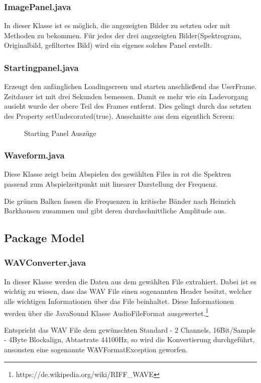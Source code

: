 \documentclass[12pt,a4paper]{article}
\begin{document}
\subsubsection{ImagePanel.java}
In dieser Klasse ist es möglich, die angezeigten Bilder zu setzten oder mit Methoden zu bekommen. Für jedes der drei angezeigten Bilder(Spektrogram, Originalbild, gefiltertes Bild) wird ein eigenes solches Panel erstellt.
\subsubsection{Startingpanel.java}
Erzeugt den anfänglichen Loadingscreen und starten anschließend das UserFrame. Zeitdauer ist mit drei Sekunden bemessen. Damit es mehr wie ein Ladevorgang ausieht wurde der obere Teil des Frames entfernt. Dies gelingt durch das setzten des Property setUndecorated(true).
Ausschnitte aus dem eigentlich Screen:
\begin{figure} [h]%
	\centering
	\label{fig:startingpanel} 
	\caption{Starting Panel Auszüge}
\end{figure}\newpage

\subsubsection{Waveform.java}
Diese Klasse zeigt beim Abspielen des gewählten Files in rot die Spektren passend zum Abspielzeitpunkt mit linearer Darstellung der Frequenz.

Die grünen Balken fassen die Frequenzen in kritische Bänder nach Heinrich Barkhausen zusammen und gibt deren durchschnittliche Amplitude aus.
\subsection{Package Model}
\subsubsection{WAVConverter.java}
In dieser Klasse werden die Daten aus dem gewählten File extrahiert. Dabei ist es wichtig zu wissen, dass das WAV File einen sogenannten Header besitzt, welcher alle wichtigen Informationen über das File beinhaltet. Diese Informationen werden über die JavaSound Klasse AudioFileFormat ausgewertet.\footnote{https://de.wikipedia.org/wiki/RIFF\_WAVE}


Entspricht das WAV File dem gewünschten Standard - 2 Channels, 16Bit/Sample - 4Byte Blockalign, Abtastrate  44100Hz, so wird die Konvertierung durchgeführt, ansonsten eine sogenannte WAVFormatException geworfen.
\end{document}
